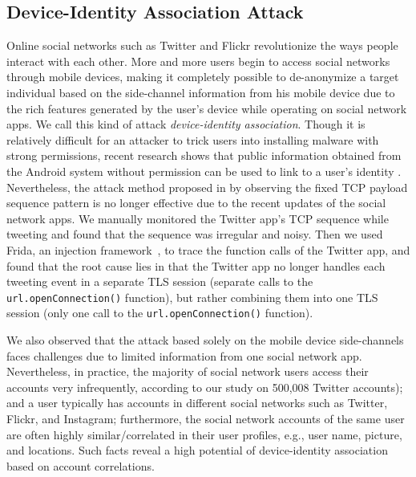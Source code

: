 \documentclass[letterpaper,12pt]{article}
\begin{document}
\subsection{Device-Identity Association Attack}
Online social networks such as Twitter and Flickr revolutionize the ways people interact with each other. More and more users begin to access social networks through mobile devices, making it completely possible to de-anonymize a target individual based on the side-channel information from his mobile device due to the rich features generated by the user's device while operating on social network apps. We call this kind of attack \emph{device-identity association}. Though it is relatively difficult for an attacker to trick users into installing malware with strong permissions, recent research shows that public information obtained from the Android system without permission can be used to link to a user's identity \cite{zhou2013identity}. Nevertheless, the attack method proposed in \cite{zhou2013identity} by observing the fixed TCP payload sequence pattern is no longer effective due to the recent updates of the social network apps. We manually monitored the Twitter app's TCP sequence while tweeting and found that the sequence was irregular and noisy. Then we used Frida, an injection framework~\cite{frida}, to trace the function calls of the Twitter app, and found that the root cause lies in that the Twitter app no longer handles each tweeting event in a separate TLS session (separate calls to the \texttt{url.openConnection()} function), but rather combining them into one TLS session (only one call to the \texttt{url.openConnection()} function).

We also observed that the attack based solely on the mobile device side-channels faces challenges due to limited information from one social network app. Nevertheless, in practice, the majority of social network users access their accounts very infrequently, according to our study on 500,008 Twitter accounts); and a user typically has accounts in different social networks such as Twitter, Flickr, and Instagram; furthermore, the social network accounts of the same user are often highly similar/correlated in their user profiles, e.g., user name, picture, and locations. Such facts reveal a high potential of device-identity association based on account correlations. 
\end{document}

